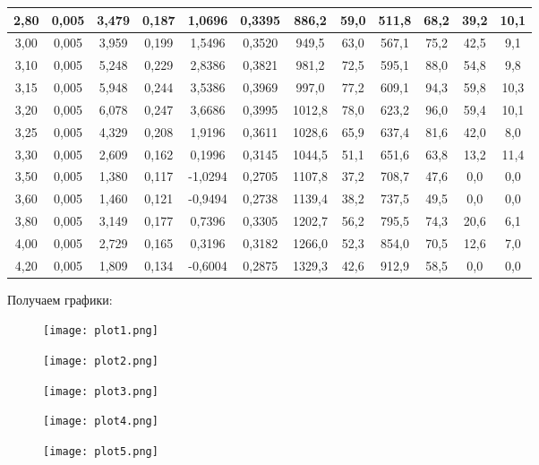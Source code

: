\documentclass[12pt]{article}
\begin{document}
\begin{center}
\begin{tabular}{|c|c|c|c|c|c|c|c|c|c|c|c|}
2,80 & 0,005 & 3,479 & 0,187 & 1,0696 & 0,3395 & 886,2 & 59,0 & 511,8 & 68,2 & 39,2 & 10,1 \\ \hline
3,00 & 0,005 & 3,959 & 0,199 & 1,5496 & 0,3520 & 949,5 & 63,0 & 567,1 & 75,2 & 42,5 & 9,1 \\ \hline
3,10 & 0,005 & 5,248 & 0,229 & 2,8386 & 0,3821 & 981,2 & 72,5 & 595,1 & 88,0 & 54,8 & 9,8 \\ \hline
3,15 & 0,005 & 5,948 & 0,244 & 3,5386 & 0,3969 & 997,0 & 77,2 & 609,1 & 94,3 & 59,8 & 10,3 \\ \hline
3,20 & 0,005 & 6,078 & 0,247 & 3,6686 & 0,3995 & 1012,8 & 78,0 & 623,2 & 96,0 & 59,4 & 10,1 \\ \hline
3,25 & 0,005 & 4,329 & 0,208 & 1,9196 & 0,3611 & 1028,6 & 65,9 & 637,4 & 81,6 & 42,0 & 8,0 \\ \hline
3,30 & 0,005 & 2,609 & 0,162 & 0,1996 & 0,3145 & 1044,5 & 51,1 & 651,6 & 63,8 & 13,2 & 11,4 \\ \hline
3,50 & 0,005 & 1,380 & 0,117 & -1,0294 & 0,2705 & 1107,8 & 37,2 & 708,7 & 47,6 & 0,0 & 0,0 \\ \hline
3,60 & 0,005 & 1,460 & 0,121 & -0,9494 & 0,2738 & 1139,4 & 38,2 & 737,5 & 49,5 & 0,0 & 0,0 \\ \hline
3,80 & 0,005 & 3,149 & 0,177 & 0,7396 & 0,3305 & 1202,7 & 56,2 & 795,5 & 74,3 & 20,6 & 6,1 \\ \hline
4,00 & 0,005 & 2,729 & 0,165 & 0,3196 & 0,3182 & 1266,0 & 52,3 & 854,0 & 70,5 & 12,6 & 7,0 \\ \hline
4,20 & 0,005 & 1,809 & 0,134 & -0,6004 & 0,2875 & 1329,3 & 42,6 & 912,9 & 58,5 & 0,0 & 0,0 \\ \hline
   \end{tabular}
\end{center}
Получаем графики:
\begin{figure}[ht]
    \centering
    \texttt{[image: plot1.png]}
    \label{fig:plot1}
\end{figure}
\begin{figure}[ht]
    \centering
    \texttt{[image: plot2.png]}
    \label{fig:plot2}
\end{figure}
\begin{figure}[ht]
    \centering
    \texttt{[image: plot3.png]}
    \label{fig:plot3}
\end{figure}
\begin{figure}[ht]
    \centering
    \texttt{[image: plot4.png]}
    \label{fig:plot4}
\end{figure}
\begin{figure}[ht]
    \centering
    \texttt{[image: plot5.png]}
    \label{fig:plot5}
\end{figure}
\end{document}
